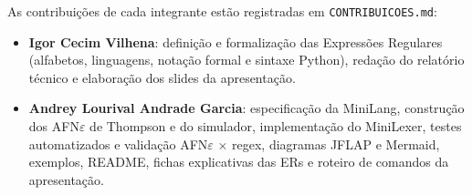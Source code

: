 As contribuições de cada integrante estão registradas em \texttt{CONTRIBUICOES.md}:

\begin{itemize}
\item \textbf{Igor Cecim Vilhena}: definição e formalização das Expressões Regulares (alfabetos, linguagens, notação formal e sintaxe Python), redação do relatório técnico e elaboração dos slides da apresentação.
\item \textbf{Andrey Lourival Andrade Garcia}: especificação da MiniLang, construção dos AFN$\varepsilon$ de Thompson e do simulador, implementação do MiniLexer, testes automatizados e validação AFN$\varepsilon$ $\times$ regex, diagramas JFLAP e Mermaid, exemplos, README, fichas explicativas das ERs e roteiro de comandos da apresentação.
\end{itemize}
